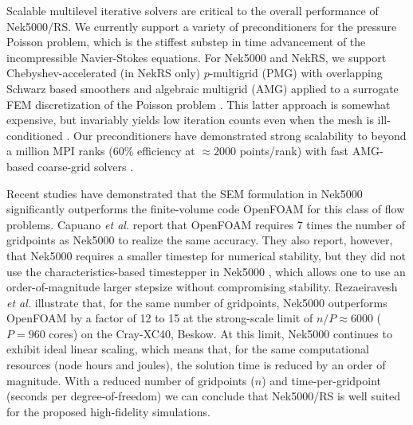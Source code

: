 Scalable multilevel iterative solvers are critical to the overall performance
of Nek5000/RS.   We currently support a variety of preconditioners for the
pressure Poisson problem, which is the stiffest substep in time advancement of
the incompressible Navier-Stokes equations.  For Nek5000 and NekRS, we support
Chebyshev-accelerated (in NekRS only) $p$-multigrid (PMG) with overlapping
Schwarz based smoothers \cite{lottes05,nekrs} and algebraic multigrid (AMG)
applied to a surrogate FEM discretization of the Poisson problem
\cite{pedro19,sao80}.  This latter approach is somewhat expensive, but
invariably yields low iteration counts even when the mesh is ill-conditioned
\cite{fischer97}.  Our preconditioners have demonstrated strong scalability to
beyond a million MPI ranks (60\% efficiency at $\approx 2000$ points/rank) with
fast AMG-based coarse-grid solvers \cite{fischer15}.


Recent studies
have demonstrated that the SEM formulation in Nek5000 significantly outperforms
the finite-volume code OpenFOAM for this class of flow problems.  Capuano {\em
et al.} \cite{palumbo} report that OpenFOAM requires 7 times the number of
gridpoints as Nek5000 to realize the same accuracy.  They also report, however,
that Nek5000 requires a smaller timestep for numerical stability, but they did
not use the characteristics-based timestepper in Nek5000 \cite{patel18},  which
allows one to use an order-of-magnitude larger stepsize without compromising
stability.  Rezaeiravesh {\em et al.} \cite{schlatter21} illustrate that,
for the same number of gridpoints, Nek5000 outperforms OpenFOAM by a factor
of 12 to 15 at the strong-scale limit of $n/P \approx 6000$ ($P=960$ cores) on
the Cray-XC40, Beskow.  At this limit, Nek5000 continues to exhibit ideal linear
scaling, which means that, for the same computational resources (node hours and
joules), the solution time is reduced by an order of magnitude.  With a reduced
number of gridpoints ($n$) and time-per-gridpoint (seconds per
degree-of-freedom) we can conclude that Nek5000/RS is well suited for the 
proposed high-fidelity simulations.



